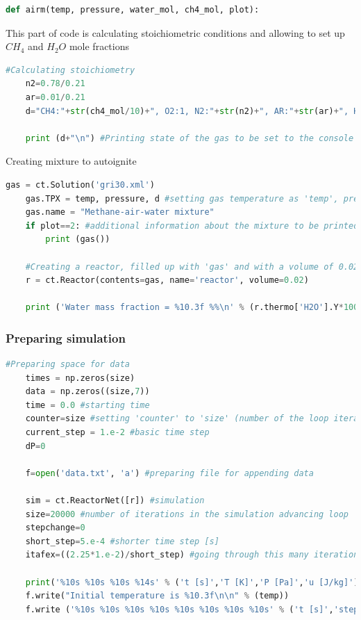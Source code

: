 \documentclass[a4paper]{article}
\begin{document}
	\begin{lstlisting}[language=python]
def airm(temp, pressure, water_mol, ch4_mol, plot):

\end{lstlisting}
    
This part of code is calculating stoichiometric conditions and allowing to set up $CH_4$ and $H_2O$ mole fractions

\begin{lstlisting}[language=python]
    #Calculating stoichiometry
    n2=0.78/0.21
    ar=0.01/0.21
    d="CH4:"+str(ch4_mol/10)+", O2:1, N2:"+str(n2)+", AR:"+str(ar)+", H2O:"+str(water_mol)  

    print (d+"\n") #Printing state of the gas to be set to the console
\end{lstlisting}
Creating mixture to autoignite
\begin{lstlisting}[language=python]
    gas = ct.Solution('gri30.xml')
    gas.TPX = temp, pressure, d #setting gas temperature as 'temp', pressure as 'pressure' and molar fractions as in 'd'
    gas.name = "Methane-air-water mixture"
    if plot==2: #additional information about the mixture to be printed if 'plot' was set to '2'
        print (gas())
    
    #Creating a reactor, filled up with 'gas' and with a volume of 0.02 cubic meters
    r = ct.Reactor(contents=gas, name='reactor', volume=0.02)
    
    print ('Water mass fraction = %10.3f %%\n' % (r.thermo['H2O'].Y*100))
\end{lstlisting}
\subsubsection{Preparing simulation}
\begin{lstlisting}[language=python]
    #Preparing space for data 
    times = np.zeros(size)
    data = np.zeros((size,7))   
    time = 0.0 #starting time
    counter=size #setting 'counter' to 'size' (number of the loop iterations)
    current_step = 1.e-2 #basic time step
    dP=0
    
    f=open('data.txt', 'a') #preparing file for appending data
    
    sim = ct.ReactorNet([r]) #simulation
    size=20000 #number of iterations in the simulation advancing loop
    stepchange=0
    short_step=5.e-4 #shorter time step [s]
    itafex=((2.25*1.e-2)/short_step) #going through this many iterations at specified 

    print('%10s %10s %10s %14s' % ('t [s]','T [K]','P [Pa]','u [J/kg]'))    
    f.write("Initial temperature is %10.3f\n\n" % (temp))
    f.write ('%10s %10s %10s %10s %10s %10s %10s %10s' % ('t [s]','step [s]','dT [K]','T [K]', 'dP [Pa]', 'P [Pa]', 'licznik', 'iteration\n'))
\end{lstlisting}
\end{document}
